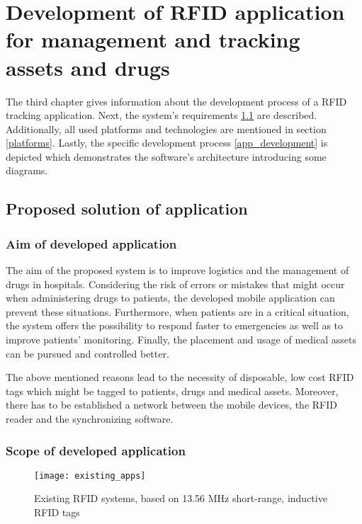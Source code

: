 \chapter{Development of RFID application for management and tracking assets and drugs}
\label{Kap3}

The third chapter gives information about the development process of a RFID tracking application. Next, the system's requirements \ref{requirements} are described. Additionally, all used platforms and technologies are mentioned in section \ref{platforms}. Lastly, the specific development process \ref{app_development} is depicted which demonstrates the software's architecture introducing some diagrams. 

\section{Proposed solution of application}\label{requirements}

\subsection{Aim of developed application}

The aim of the proposed system is to improve logistics and the management of drugs in hospitals. Considering the risk of errors or mistakes that might occur when administering drugs to patients, the developed mobile application can prevent these situations. Furthermore, when patients are in a critical situation, the system offers the possibility to respond faster to emergencies as well as to improve patients' monitoring. Finally, the placement and usage of medical assets can be pursued and controlled better. 

The above mentioned reasons lead to the necessity of disposable, low cost RFID tags which might be tagged to patients, drugs and medical assets. Moreover, there has to be established a network between the mobile devices, the RFID reader and the synchronizing software. 

\subsection{Scope of developed application}

\begin{figure}
\centering
\texttt{[image: existing\_apps]} 
\caption{\label{fig:existing_apps} Existing RFID systems, based on 13.56 MHz short-range, inductive RFID tags} 
\end{figure}

